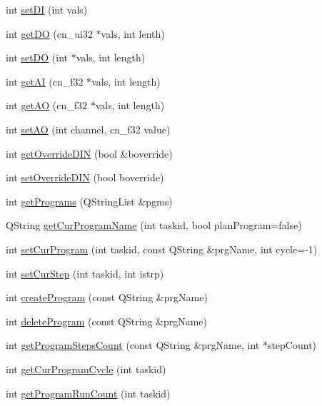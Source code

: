 \begin{DoxyCompactItemize}
\item 
int \hyperlink{classCNRobo_ad36522524ad59011dbe86c30dfd6bbc6}{set\-D\-I} (int vals)
\item 
int \hyperlink{classCNRobo_aff1922ec73af017799afbc2e74fefbcc}{get\-D\-O} (cn\-\_\-ui32 $\ast$vals, int lenth)
\item 
int \hyperlink{classCNRobo_a0f5b42f8973d9ce171e46d8ce9699f69}{set\-D\-O} (int $\ast$vals, int length)
\item 
int \hyperlink{classCNRobo_a7e88bf201da79e52e18943e19c2c4a73}{get\-A\-I} (cn\-\_\-f32 $\ast$vals, int length)
\item 
int \hyperlink{classCNRobo_a7fabcb17a5dfb5893f96d5cc60e37958}{get\-A\-O} (cn\-\_\-f32 $\ast$vals, int length)
\item 
int \hyperlink{classCNRobo_a80dd3843161b52dd4776c1fc9bb70f60}{set\-A\-O} (int channel, cn\-\_\-f32 value)
\item 
int \hyperlink{classCNRobo_a579d6cdb31155535cafdd6ac9a08767a}{get\-Override\-D\-I\-N} (bool \&boverride)
\item 
int \hyperlink{classCNRobo_af68d1d8ea22f6f439d389f22e6ca2445}{set\-Override\-D\-I\-N} (bool boverride)
\item 
int \hyperlink{classCNRobo_ac23f50f0f4122a2073250678f76866b9}{get\-Programs} (Q\-String\-List \&pgms)
\item 
Q\-String \hyperlink{classCNRobo_af06f5a4ffb41c3308d98b8e8671f6e0e}{get\-Cur\-Program\-Name} (int taskid, bool plan\-Program=false)
\item 
int \hyperlink{classCNRobo_a5b776cbf5fa9d3c90c3cb114bd9f7a33}{set\-Cur\-Program} (int taskid, const Q\-String \&prg\-Name, int cycle=-\/1)
\item 
int \hyperlink{classCNRobo_a6db2234146c426257220430217a35058}{set\-Cur\-Step} (int taskid, int istrp)
\item 
int \hyperlink{classCNRobo_ac50af1a4c6683c90dcebe72cb1e0010f}{create\-Program} (const Q\-String \&prg\-Name)
\item 
int \hyperlink{classCNRobo_a722fd38f2b8a69f43c42b87311b1c5b0}{delete\-Program} (const Q\-String \&prg\-Name)
\item 
int \hyperlink{classCNRobo_a974af011ee96b05eee78e8ebd0b361fe}{get\-Program\-Steps\-Count} (const Q\-String \&prg\-Name, int $\ast$step\-Count)
\item 
int \hyperlink{classCNRobo_a02fb62e994acf47f0efa80bef7d15ec1}{get\-Cur\-Program\-Cycle} (int taskid)
\item 
int \hyperlink{classCNRobo_a6845f26f2c5a7a6e80c8a46cf7b04820}{get\-Program\-Run\-Count} (int taskid)

\end{DoxyCompactItemize}
